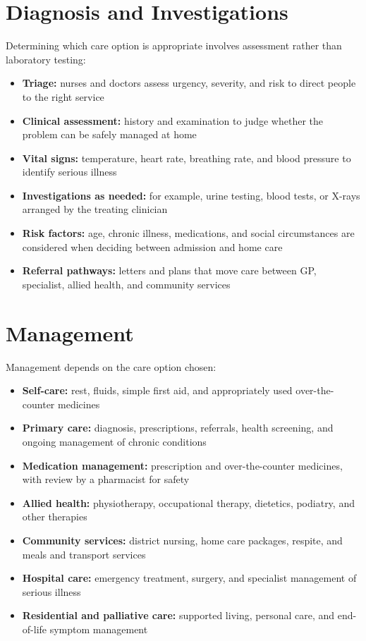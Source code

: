\section*{Diagnosis and Investigations}
Determining which care option is appropriate involves assessment rather than laboratory testing:
\begin{itemize}
    \item \textbf{Triage:} nurses and doctors assess urgency, severity, and risk to direct people to the right service
    \item \textbf{Clinical assessment:} history and examination to judge whether the problem can be safely managed at home
    \item \textbf{Vital signs:} temperature, heart rate, breathing rate, and blood pressure to identify serious illness
    \item \textbf{Investigations as needed:} for example, urine testing, blood tests, or X-rays arranged by the treating clinician
    \item \textbf{Risk factors:} age, chronic illness, medications, and social circumstances are considered when deciding between admission and home care
    \item \textbf{Referral pathways:} letters and plans that move care between GP, specialist, allied health, and community services
\end{itemize}

\section*{Management}
Management depends on the care option chosen:
\begin{itemize}
    \item \textbf{Self-care:} rest, fluids, simple first aid, and appropriately used over-the-counter medicines
    \item \textbf{Primary care:} diagnosis, prescriptions, referrals, health screening, and ongoing management of chronic conditions
    \item \textbf{Medication management:} prescription and over-the-counter medicines, with review by a pharmacist for safety
    \item \textbf{Allied health:} physiotherapy, occupational therapy, dietetics, podiatry, and other therapies
    \item \textbf{Community services:} district nursing, home care packages, respite, and meals and transport services
    \item \textbf{Hospital care:} emergency treatment, surgery, and specialist management of serious illness
    \item \textbf{Residential and palliative care:} supported living, personal care, and end-of-life symptom management
\end{itemize}

